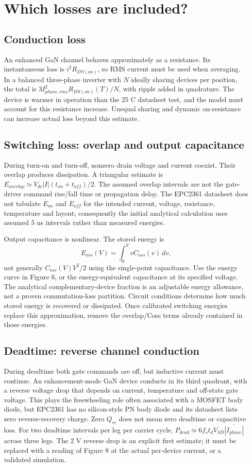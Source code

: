 \section{Which losses are included?}
\subsection{Conduction loss}
An enhanced GaN channel behaves approximately as a resistance. Its instantaneous
loss is $i^2R_{DS(on)}$, so RMS current must be used when averaging. In a
balanced three-phase inverter with $N$ ideally sharing devices per position,
the total is $3I_{phase,rms}^2R_{DS(on)}(T)/N$, with ripple added in quadrature.
The device is warmer in operation than the 25 C datasheet test, and the model
must account for this resistance increase. Unequal sharing and dynamic
on-resistance can increase actual loss beyond this estimate.

\subsection{Switching loss: overlap and output capacitance}
During turn-on and turn-off, nonzero drain voltage and current coexist.
Their overlap produces dissipation. A triangular estimate is
$E_{overlap}\simeq V_{dc}|I|(t_{on}+t_{off})/2$. The assumed overlap intervals
are not the gate-driver command rise/fall time or propagation delay.
The EPC2361 datasheet does not tabulate $E_{on}$ and $E_{off}$ for the intended
current, voltage, resistance, temperature and layout; consequently the initial
analytical calculation uses assumed 5 ns intervals rather than measured energies.

Output capacitance is nonlinear. The stored energy is
\[E_{oss}(V)=\int_0^V v C_{oss}(v)\,dv,\]
not generally $C_{oss}(V)V^2/2$ using the single-point capacitance.
Use the energy curve in Figure 6, or the energy-equivalent capacitance at its
specified voltage. The analytical complementary-device fraction is an adjustable
energy allowance, not a proven commutation-loss partition. Circuit conditions
determine how much stored energy is recovered or dissipated.
Once calibrated switching energies replace this approximation, remove the
overlap/Coss terms already contained in those energies.

\subsection{Deadtime: reverse channel conduction}
During deadtime both gate commands are off, but inductive current must continue.
An enhancement-mode GaN device conducts in its third quadrant, with a reverse
voltage drop that depends on current, temperature and off-state gate voltage.
This plays the freewheeling role often associated with a MOSFET body diode,
but EPC2361 has no silicon-style PN body diode and its datasheet lists zero
reverse-recovery charge. Zero $Q_{rr}$ does not mean zero deadtime or capacitive loss.
For two deadtime intervals per leg per carrier cycle,
$P_{dead}\simeq 6f_s t_d V_{SD}\overline{|I_{phase}|}$ across three legs.
The 2 V reverse drop is an explicit first estimate; it must be replaced with a
reading of Figure 8 at the actual per-device current, or a validated simulation.

